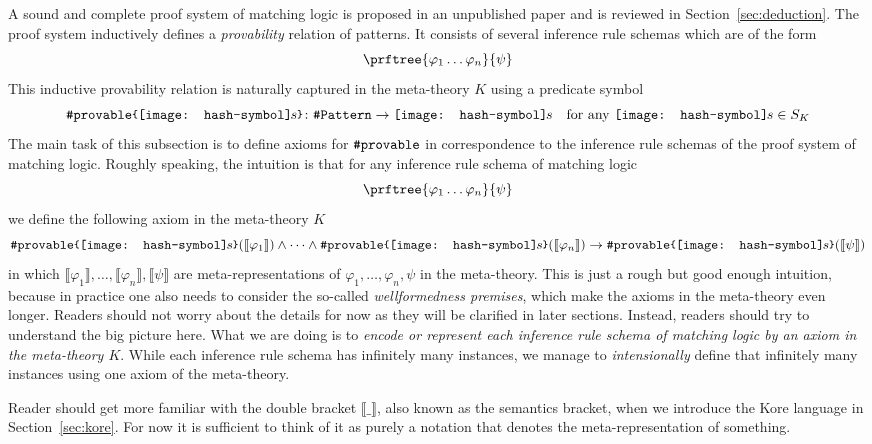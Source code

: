 \documentclass[UTF8,11pt]{article}
\theoremstyle{plain}
\theoremstyle{definition}
\theoremstyle{remark}
\newcommand{\parametric}[2]{{#1}\raisebox{.2ex}{\texttt{\footnotesize{\{}}}#2\raisebox{.2ex}{\texttt{\footnotesize{\}}}}}
\newcommand{\denote}[1]{\llbracket{#1}\rrbracket}
\newcommand{\shp}{\texttt{[image: hash-symbol]}\kern-0.1em}
\newcommand{\sharpsymbol}{\#}
\newcommand{\shs}{\shp s}
\newcommand{\KPattern}{\texttt{\sharpsymbol Pattern}}
\newcommand{\Kdeduce}{\textup{\texttt{\sharpsymbol provable}}}
\begin{document}
A sound and complete proof system of matching logic is proposed 
in an unpublished paper and is reviewed in Section~\ref{sec:deduction}.
The proof system inductively defines a \emph{provability} relation of patterns.
It consists of several inference rule schemas which are of the form
$$
\prftree
{ \varphi_1 \dots  \varphi_n}
{ \psi }
$$
This inductive provability relation is naturally captured in the meta-theory 
$K$ using a predicate symbol
$$
\parametric{\Kdeduce}{\shs} \colon \KPattern \to \shs \quad \text{for any $\shs 
\in S_K$}
$$
The main task of this subsection is to define axioms for $\Kdeduce$ in 
correspondence to the inference rule schemas of the proof system of matching 
logic.
Roughly speaking, the intuition is that for any inference rule schema of 
matching logic
$$
\prftree
{ \varphi_1 \dots  \varphi_n}
{ \psi }
$$
we define the following axiom in the meta-theory $K$
$$\parametric{\Kdeduce}{\shs}(\denote{\varphi_1}) \wedge \dots \wedge 
\parametric{\Kdeduce}{\shs}(\denote{\varphi_n}) \to 
\parametric{\Kdeduce}{\shs}(\denote{\psi})$$
in which $\denote{\varphi_1}, \dots, 
\denote{\varphi_n}, \denote{\psi}$ are meta-representations of $\varphi_1, 
\dots, \varphi_n, \psi$ in the meta-theory.
This is just a rough but good enough intuition, because in practice one also 
needs to consider the so-called \emph{wellformedness premises}, which make the 
axioms in the meta-theory even longer.
Readers should not worry about the details for now as they will be clarified in 
later sections.
Instead, readers should try to understand the big picture here.
What we are doing is to \emph{encode or represent each inference rule 
schema of matching logic by an axiom in the meta-theory $K$}.
While each inference rule schema has infinitely many instances, we manage to 
\emph{intensionally} define that infinitely many instances using one axiom of 
the meta-theory.

Reader should get more familiar with the double bracket $\denote{\_}$, also 
known as the semantics bracket, when we introduce the Kore language in 
Section~\ref{sec:kore}.
For now it is sufficient to think of it as purely a notation that denotes the 
meta-representation of something.
\end{document}
